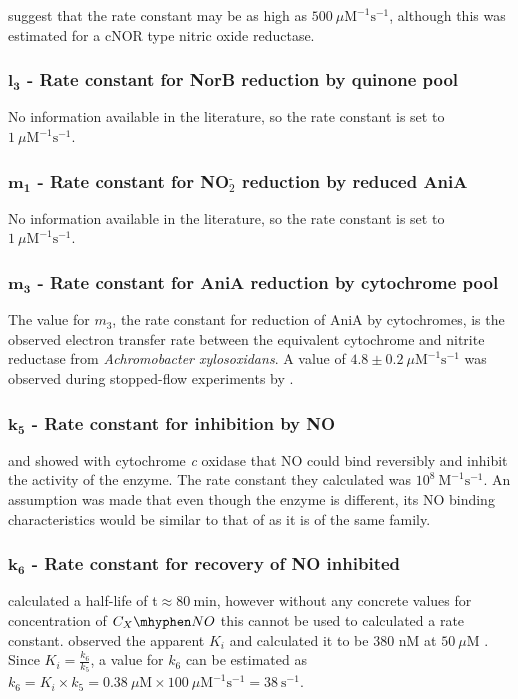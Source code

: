 \citet{Wasser2002} suggest that the rate constant may be as high as $500~\mu \mathrm{M}^{-1} \mathrm{s}^{-1}$, although this was estimated for a cNOR type nitric oxide reductase.

\subsubsection*{$\mathbf{l_3}$ {\bf- Rate constant for NorB reduction by quinone pool}}
No information available in the literature, so the rate constant is set to $1~\mu \mathrm{M}^{-1}\mathrm{s}^{-1}$.

\subsubsection*{$\mathbf{m_1}$ {\bf- Rate constant for NO$_{\textrm{2}}^{\textrm{-}}$ reduction by reduced AniA}}
No information available in the literature, so the rate constant is set to $1~\mu \mathrm{M}^{-1}\mathrm{s}^{-1}$.

\subsubsection*{$\mathbf{m_3}$ {\bf- Rate constant for AniA reduction by cytochrome pool}}
The value for $m_3$, the rate constant for reduction of AniA by cytochromes, is the observed electron transfer rate between the equivalent cytochrome and nitrite reductase from \textit{Achromobacter xylosoxidans}. A value of $4.8\pm0.2~\mu \mathrm{M}^{-1}\mathrm{s}^{-1}$ was observed during stopped-flow experiments by \citet{Nojiri2009}.

\subsubsection*{$\mathbf{k_5}$ {\bf- Rate constant for \cbbthree{} inhibition by NO}}
\citet{Giuffre2000} and \citet{Blackmore1991} showed with cytochrome \textit{c} oxidase that NO could bind reversibly and inhibit the activity of the enzyme. The rate constant they calculated was $10^8~\mathrm{M}^{-1}\mathrm{s}^{-1}$. An assumption was made that even though the enzyme is different, its NO binding characteristics would be similar to that of \cbbthree{} as it is of the same family.

\subsubsection*{$\mathbf{k_6}$ {\bf- Rate constant for recovery of NO inhibited \cbbthree{}}}
\citet{Giuffre2000} calculated a half-life of t\textonehalf $\approx 80~\mathrm{min}$, however without any concrete values for concentration of $C_X\mhyphen NO$ this cannot be used to calculated a rate constant.
\citet{Rock2005} observed the apparent $K_i$ and calculated it to be 380 nM at $50~\mu \mathrm{M}$ \cOxygen{}. Since $K_i = \frac{k_6}{k_5}$, a value for $k_6$ can be estimated as $k_6 = K_i \times k_5 = 0.38~\mu \mathrm{M} \times 100~\mu \mathrm{M}^{-1}\mathrm{s}^{-1} = 38~\mathrm{s}^{-1}$.

